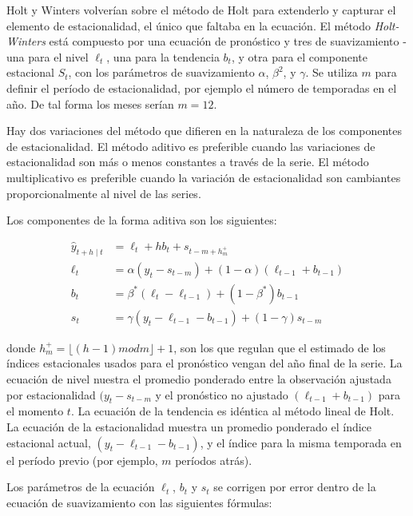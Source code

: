 Holt y Winters volverían sobre el método de Holt para extenderlo y capturar el elemento de estacionalidad, el único que faltaba en la ecuación. El método \emph{Holt-Winters} está compuesto por una ecuación de pronóstico y tres de suavizamiento - una para el nivel $\ell_{t}$, una para la tendencia $b_{t}$, y otra para el componente estacional $S_t$, con los parámetros de suavizamiento $\alpha$, $\beta^{2}$, y $\gamma$. Se utiliza $m$ para definir el período de estacionalidad, por ejemplo el número de temporadas en el año. De tal forma los meses serían $m=12$.

Hay dos variaciones del método que difieren en la naturaleza de los componentes de estacionalidad. El método aditivo es preferible cuando las variaciones de estacionalidad son más o menos constantes a través de la serie. El método multiplicativo es preferible cuando la variación de estacionalidad son cambiantes proporcionalmente al nivel de las series.

Los componentes de la forma aditiva son los siguientes:

\begin{equation}
\begin{split}
	\hat{y}_{t+h \mid t} & = \ell_{t} + hb_{t} + s_{t-m+h_{m}^{+}} \\
 	\ell_{t} & = \alpha(y_{t} - s_{t-m}) + (1 - \alpha)(\ell_{t-1} + b_{t-1}) \\
    b_{t} & = \beta^{*}(\ell_{t} - \ell_{t-1}) + (1 - \beta^{*})b_{t-1} \\
    s_{t} & = \gamma(y_{t} - \ell_{t-1} - b_{t-1}) + (1-\gamma)s_{t-m}
\end{split}
\end{equation}

donde $h_{m}^{+} = \lfloor (h-1) mod m \rfloor + 1$, son los que regulan que el estimado de los índices estacionales usados para el pronóstico vengan del año final de la serie. La ecuación de nivel nuestra el promedio ponderado entre la observación ajustada por estacionalidad $(y_{t} - s_{t-m}$ y el pronóstico no ajustado $(\ell_{t-1} + b_{t-1})$ para el momento $t$. La ecuación de la tendencia es idéntica al método lineal de Holt. La ecuación de la estacionalidad muestra un promedio ponderado el índice estacional actual, $(y_{t} - \ell_{t-1} - b_{t-1})$, y el índice para la misma temporada en el período previo (por ejemplo, $m$ períodos atrás).

Los parámetros de la ecuación $\ell_{t}$, $b_{t}$ y $s_{t}$ se corrigen por error dentro de la ecuación de suavizamiento con las siguientes fórmulas:

